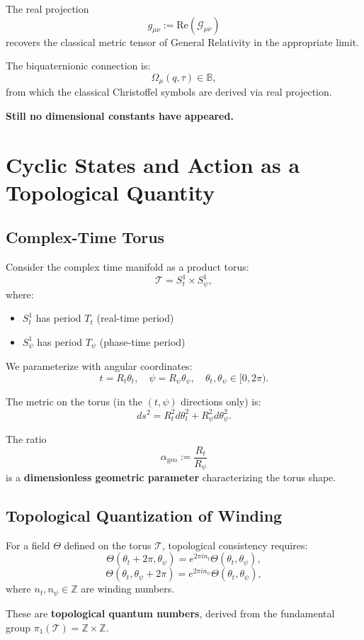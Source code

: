 \documentclass[12pt]{article}
\begin{document}
The real projection
\[
g_{\mu\nu} := \text{Re}(\mathcal{G}_{\mu\nu})
\]
recovers the classical metric tensor of General Relativity in the appropriate limit.

The biquaternionic connection is:
\[
\Omega_\mu(q, \tau) \in \mathbb{B},
\]
from which the classical Christoffel symbols are derived via real projection.

\textbf{Still no dimensional constants have appeared.}

\section{Cyclic States and Action as a Topological Quantity}

\subsection{Complex-Time Torus}

Consider the complex time manifold as a product torus:
\[
\mathcal{T} = S^1_t \times S^1_\psi,
\]
where:
\begin{itemize}
\item $S^1_t$ has period $T_t$ (real-time period)
\item $S^1_\psi$ has period $T_\psi$ (phase-time period)
\end{itemize}

We parameterize with angular coordinates:
\[
t = R_t \theta_t, \quad \psi = R_\psi \theta_\psi, \quad \theta_t, \theta_\psi \in [0, 2\pi).
\]

The metric on the torus (in the $(t, \psi)$ directions only) is:
\[
ds^2 = R_t^2 d\theta_t^2 + R_\psi^2 d\theta_\psi^2.
\]

The ratio
\[
\alpha_{\text{geo}} := \frac{R_t}{R_\psi}
\]
is a \textbf{dimensionless geometric parameter} characterizing the torus shape.

\subsection{Topological Quantization of Winding}

For a field $\Theta$ defined on the torus $\mathcal{T}$, topological consistency requires:
\[
\Theta(\theta_t + 2\pi, \theta_\psi) = e^{2\pi i n_t} \Theta(\theta_t, \theta_\psi),
\]
\[
\Theta(\theta_t, \theta_\psi + 2\pi) = e^{2\pi i n_\psi} \Theta(\theta_t, \theta_\psi),
\]
where $n_t, n_\psi \in \mathbb{Z}$ are winding numbers.

These are \textbf{topological quantum numbers}, derived from the fundamental group $\pi_1(\mathcal{T}) = \mathbb{Z} \times \mathbb{Z}$.
\end{document}
